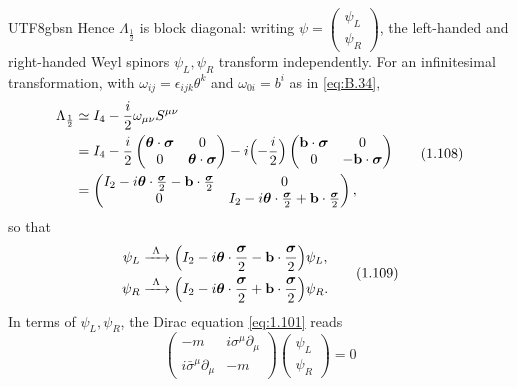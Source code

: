 \documentclass[11pt,a4paper,oneside]{report}
\begin{document}
\begin{CJK*}{UTF8}{gbsn}
Hence $\Lambda_{\frac12}$ is block diagonal: writing $\psi=\begin{pmatrix}\psi_L\\\psi_R\end{pmatrix}$, the left-handed and right-handed Weyl spinors $\psi_L,\psi_R$ transform independently. For an infinitesimal transformation, with $\omega_{ij}=\epsilon_{ijk}\theta^k$ and $\omega_{0i}=b^i$ as in \eqref{eq:B.34},
\begin{equation*}
\begin{aligned}
\Lambda_{\frac12}
&\simeq I_4-\frac i2\omega_{\mu\nu}S^{\mu\nu}\\
&=I_4-\frac i2\begin{pmatrix}\boldsymbol\theta\cdot\boldsymbol\sigma&0\\0&\boldsymbol\theta\cdot\boldsymbol\sigma\end{pmatrix}
-i\Bigl(-\frac i2\Bigr)\begin{pmatrix}\mathbf b\cdot\boldsymbol\sigma&0\\0&-\mathbf b\cdot\boldsymbol\sigma\end{pmatrix}\\
&=\begin{pmatrix}I_2-i\boldsymbol\theta\cdot\frac{\boldsymbol\sigma}2-\mathbf b\cdot\frac{\boldsymbol\sigma}2&0\\0&I_2-i\boldsymbol\theta\cdot\frac{\boldsymbol\sigma}2+\mathbf b\cdot\frac{\boldsymbol\sigma}2\end{pmatrix},
\end{aligned}
\tag{1.108}\label{eq:1.108}
\end{equation*}
so that
\begin{equation*}
\begin{aligned}
\psi_L&\xrightarrow{\ \Lambda\ }\Bigl(I_2-i\boldsymbol\theta\cdot\frac{\boldsymbol\sigma}2-\mathbf b\cdot\frac{\boldsymbol\sigma}2\Bigr)\psi_L,\\
\psi_R&\xrightarrow{\ \Lambda\ }\Bigl(I_2-i\boldsymbol\theta\cdot\frac{\boldsymbol\sigma}2+\mathbf b\cdot\frac{\boldsymbol\sigma}2\Bigr)\psi_R.
\end{aligned}
\tag{1.109}\label{eq:1.109}
\end{equation*}
In terms of $\psi_L,\psi_R$, the Dirac equation \eqref{eq:1.101} reads
\begin{equation*}
\begin{pmatrix}-m&i\sigma^\mu\partial_\mu\\i\bar\sigma^\mu\partial_\mu&-m\end{pmatrix}
\begin{pmatrix}\psi_L\\\psi_R\end{pmatrix}=0

\end{equation*}
\end{CJK*}
\end{document}
